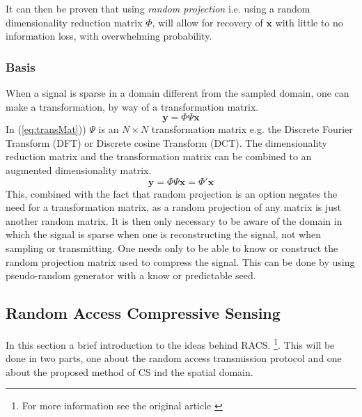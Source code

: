 \documentclass[Main]{subfiles}
\begin{document}
			It can then be proven that using \emph{random projection} i.e. using a random dimensionality reduction matrix $\Phi$, will allow for recovery of $\mathbf{x}$ with little to no information loss, with overwhelming probability.
		

		\subsubsection{Basis} %
		\label{sub:basis}
			
			When a signal is sparse in a domain different from the sampled domain, one can make a transformation, by way of a transformation matrix.
			\begin{equation}
				\mathbf{y} = \Phi \Psi \mathbf{x}
				\label{eq:transMat}	
			\end{equation}
			In (\ref{eq:transMat})) $\Psi$ is an $N \times N$ transformation matrix e.g. the Discrete Fourier Transform (DFT) or Discrete cosine Transform (DCT).
			The dimensionality reduction matrix and the transformation matrix can be combined to an augmented dimensionality matrix.
			\begin{equation}
				\mathbf{y} = \Phi \Psi \mathbf{x} = \Phi' \mathbf{x}
				\label{eq:augDimReduc}	
			\end{equation}
			This, combined with the fact that random projection is an option negates the need for a transformation matrix, as a random projection of any matrix is just another random matrix.
			It is then only necessary to be aware of the domain in which the signal is sparse when one is reconstructing the signal, not when sampling or transmitting.
			One needs only to be able to know or construct the random projection matrix used to compress the signal.
			This can be done by using pseudo-random generator with a know or predictable seed.


	\subsection{Random Access Compressive Sensing} %
	\label{sub:random_access_compressive_sensing}

		In this section a brief introduction to the ideas behind RACS.
		\footnote{For more information see the original article \cite{Fazel2011}}.
		This will be done in two parts, one about the random access transmission protocol and one about the proposed method of CS ind the spatial domain.
\end{document}
